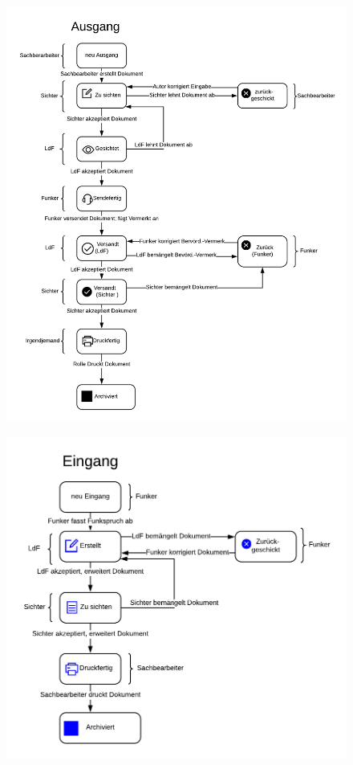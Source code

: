 \documentclass[a4paper,11pt,oneside, titlepage]{article}
\begin{document}
	\begin{figure}[htpb]

	\centering
	\includegraphics[width=0.8\linewidth]{HBausgang}
	\caption{}

	\end{figure}
	\newpage	
	\begin{figure}[htpb]
		\centering
		\includegraphics[width=0.8\linewidth]{HBeingang}
		\caption{}
	\end{figure}
	
\end{document}
